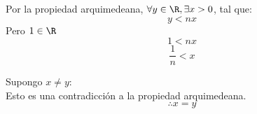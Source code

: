\documentclass[10pt]{article}
\begin{document}
\begin{prf}{}
	Por la propiedad arquimedeana, $\forall y \in \R, \exists x > 0$, tal que:
	$$y < nx$$
	Pero $1 \in \R$
	$$1 < nx$$
	$$\dfrac{1}{n} < x$$
\end{prf}

\begin{prf}[ndea]{}
	Supongo $x \neq y$:\\
	Esto es una contradicción a la propiedad arquimedeana.
	$$\therefore x = y$$
\end{prf}
\end{document}
